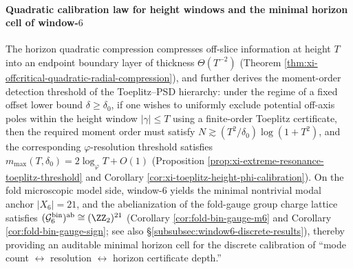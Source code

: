 \paragraph{Quadratic calibration law for height windows and the minimal horizon cell of window-\texorpdfstring{\(6\)}{6}}
The horizon quadratic compression compresses off-slice information at height \(T\) into an endpoint boundary layer of thickness \(\Theta(T^{-2})\) (Theorem \ref{thm:xi-offcritical-quadratic-radial-compression}), and further derives the moment-order detection threshold of the Toeplitz--PSD hierarchy:
under the regime of a fixed offset lower bound \(\delta\ge\delta_0\), if one wishes to uniformly exclude potential off-axis poles within the height window \(|\gamma|\le T\) using a finite-order Toeplitz certificate, then the required moment order must satisfy
\(
N\gtrsim (T^2/\delta_0)\log(1+T^2)
\), and the corresponding \(\varphi\)-resolution threshold satisfies
\(
m_{\max}(T,\delta_0)=2\log_{\varphi}T+O(1)
\)
(Proposition \ref{prop:xi-extreme-resonance-toeplitz-threshold} and Corollary \ref{cor:xi-toeplitz-height-phi-calibration}).
On the fold microscopic model side, window-\(6\) yields the minimal nontrivial modal anchor \(|X_6|=21\), and the abelianization of the fold-gauge group charge lattice satisfies
\(
(\mathcal{G}^{\mathrm{bin}}_6)^{\mathrm{ab}}\cong(\ZZ_2)^{21}
\)
(Corollary \ref{cor:fold-bin-gauge-m6} and Corollary \ref{cor:fold-bin-gauge-sign}; see also \S\ref{subsubsec:window6-discrete-results}), thereby providing an auditable minimal horizon cell for the discrete calibration of ``mode count \(\leftrightarrow\) resolution \(\leftrightarrow\) horizon certificate depth.''

